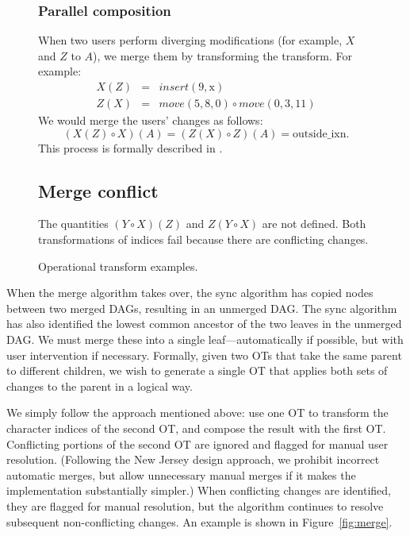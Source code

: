 \documentclass[11pt,titlepage]{article}
\begin{document}
\begin{figure}[ht]
\begin{minipage}{\textwidth}
\begin{multicols}{2}
      \subsubsection*{Parallel composition}
      When two users perform diverging modifications (for example,
      \(X\) and \(Z\) to \(A\)), we merge them by transforming the
      transform.  For example:
      \begin{eqnarray*}
        X(Z) &=& insert(9, \mathrm{x}) \\
        Z(X) &=& move(5, 8, 0) \circ move(0, 3, 11)
      \end{eqnarray*}
      We would merge the users' changes as follows: \[(X(Z) \circ
      X)(A) = (Z(X) \circ Z)(A) = \mathrm{outside\_ixn}.\] This
      process is formally described in \cite{ot}.
      \subsection*{Merge conflict}
      The quantities \((Y \circ X)(Z)\) and \(Z(Y \circ X)\) are not
      defined.  Both transformations of indices fail because there are
      conflicting changes.
    \end{multicols}
  \end{minipage}
  \caption{Operational transform examples.}
  \label{fig:ot}
\end{figure}

When the merge algorithm takes over, the sync algorithm has copied
nodes between two merged DAGs, resulting in an unmerged DAG.  The sync
algorithm has also identified the lowest common ancestor of the two
leaves in the unmerged DAG.  We must merge these into a single
leaf---automatically if possible, but with user intervention if
necessary. Formally, given two OTs that take the same parent to
different children, we wish to generate a single OT that applies both
sets of changes to the parent in a logical way.

We simply follow the approach mentioned above: use one OT to transform
the character indices of the second OT, and compose the result with
the first OT.  Conflicting portions of the second OT are ignored and
flagged for manual user resolution.  (Following the New Jersey design
approach, we prohibit incorrect automatic merges, but allow
unnecessary manual merges if it makes the implementation substantially
simpler.)  When conflicting changes are identified, they are flagged
for manual resolution, but the algorithm continues to resolve
subsequent non-conflicting changes.  An example is shown in
Figure~\ref{fig:merge}.
\end{document}
